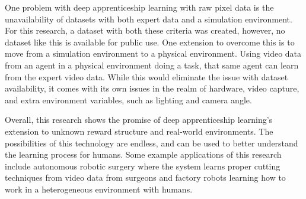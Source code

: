 \documentclass[12pt,american]{report}
\begin{document}
One problem with deep apprenticeship learning with raw pixel data is the unavailability of datasets with both expert data and a simulation environment.  For this research, a dataset with both these criteria was created, however, no dataset like this is available for public use.  One extension to overcome this is to move from a simulation environment to a physical environment.  Using video data from an agent in a physical environment doing a task, that same agent can learn from the expert video data.  While this would eliminate the issue with dataset availability, it comes with its own issues in the realm of hardware, video capture, and extra environment variables, such as lighting and camera angle.

Overall, this research shows the promise of deep apprenticeship learning's extension to unknown reward structure and real-world environments. The possibilities of this technology are endless, and can be used to better understand the learning process for humans.  Some example applications of this research include autonomous robotic surgery where the system learns proper cutting techniques from video data from surgeons and factory robots learning how to work in a heterogeneous environment with humans. 

  \nocite{*}


\begin{singlespace}

\end{singlespace}

\appendix
\end{document}
